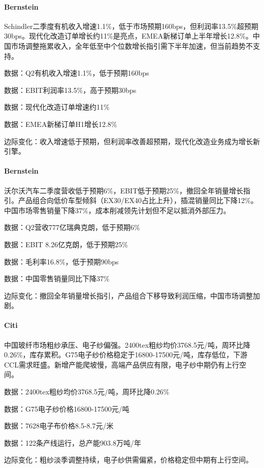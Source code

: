 \documentclass[11pt]{ctexart}
\begin{document}
\paragraph{Bernstein} Schindler二季度有机收入增速1.1\%，低于市场预期160bps，但利润率13.5\%超预期30bps。现代化改造订单增长约11\%是亮点，EMEA新梯订单上半年增长12.8\%。中国市场调整拖累收入，全年低至中个位数增长指引需下半年加速，但当前趋势不支持。
{\small\color{refgray}数据：Q2有机收入增速1.1\%，低于预期160bps\par}
{\small\color{refgray}数据：EBIT利润率13.5\%，高于预期30bps\par}
{\small\color{refgray}数据：现代化改造订单增速约11\%\par}
{\small\color{refgray}数据：EMEA新梯订单H1增长12.8\%\par}
{\small\color{refgray}边际变化：收入增速低于预期，但利润率改善超预期，现代化改造业务成为增长新引擎。\par}
\paragraph{Bernstein} 沃尔沃汽车二季度营收低于预期6\%，EBIT低于预期25\%，撤回全年销量增长指引。产品组合向低价车型倾斜（EX30/EX40占比上升），插混销量同比下降12\%。中国市场零售销量下降37\%，成本削减领先计划但不足以抵消外部压力。
{\small\color{refgray}数据：Q2营收777亿瑞典克朗，低于预期6\%\par}
{\small\color{refgray}数据：EBIT 8.26亿克朗，低于预期25\%\par}
{\small\color{refgray}数据：毛利率16.8\%，低于预期90bps\par}
{\small\color{refgray}数据：中国零售销量同比下降37\%\par}
{\small\color{refgray}边际变化：撤回全年销量增长指引，产品组合下移导致利润压缩，中国市场调整加剧。\par}
\paragraph{Citi} 中国玻纤市场粗纱承压、电子纱偏强。2400tex粗纱均价3768.5元/吨，周环比降0.26\%，库存累积。G75电子纱价格稳定于16800-17500元/吨，库存低位，下游CCL需求旺盛。新增产能爬坡慢，高端产品供应有限，电子纱中期仍有上行空间。
{\small\color{refgray}数据：2400tex粗纱均价3768.5元/吨，周环比降0.26\%\par}
{\small\color{refgray}数据：G75电子纱价格16800-17500元/吨\par}
{\small\color{refgray}数据：7628电子布价格8.5-8.7元/米\par}
{\small\color{refgray}数据：122条产线运行，总产能903.8万吨/年\par}
{\small\color{refgray}边际变化：粗纱淡季调整持续，电子纱供需偏紧，价格稳定但中期有上行空间。\par}
\end{document}
